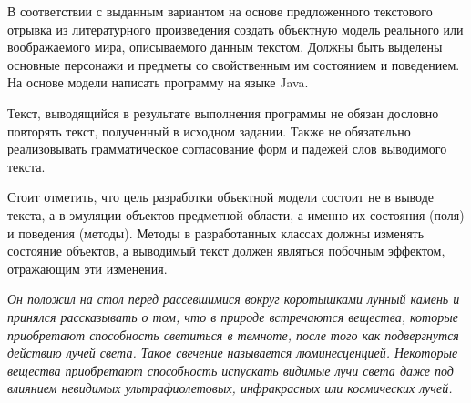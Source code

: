 В соответствии с выданным вариантом на основе предложенного текстового отрывка из литературного произведения создать объектную модель реального или воображаемого мира, описываемого данным текстом. Должны быть выделены основные персонажи и предметы со свойственным им состоянием и поведением. На основе модели написать программу на языке Java. 

Текст, выводящийся в результате выполнения программы не обязан дословно повторять текст, полученный в исходном задании. Также не обязательно реализовывать грамматическое согласование форм и падежей слов выводимого текста. 

Стоит отметить, что цель разработки объектной модели состоит не в выводе текста, а в эмуляции объектов предметной области, а именно их состояния (поля) и поведения (методы). Методы в разработанных классах должны изменять состояние объектов, а выводимый текст должен являться побочным эффектом, отражающим эти изменения.

\textit{Он положил на стол перед рассевшимися вокруг коротышками лунный камень и принялся рассказывать о том, что в природе встречаются вещества, которые приобретают способность светиться в темноте, после того как подвергнутся действию лучей света. Такое свечение называется люминесценцией. Некоторые вещества приобретают способность испускать видимые лучи света даже под влиянием невидимых ультрафиолетовых, инфракрасных или космических лучей.}
